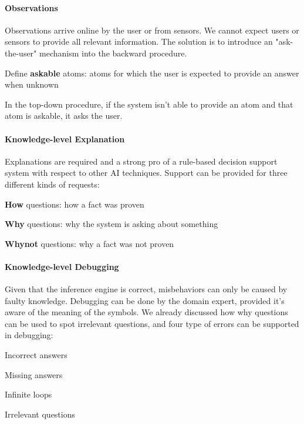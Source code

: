 \documentclass[10pt]{report}
\begin{document}
\paragraph{Observations} Observations arrive online by the user or from sensors. We cannot expect users or sensors to provide all relevant information. The solution is to introduce an "ask-the-user" mechanism into the backward procedure.
\begin{list}{}{}
	\item Define \textbf{askable} atoms: atoms for which the user is expected to provide an answer when unknown
	\item In the top-down procedure, if the system isn't able to provide an atom and that atom is askable, it asks the user.
\end{list}
\paragraph{Knowledge-level Explanation} Explanations are required and a strong pro of a rule-based decision support system with respect to other AI techniques. Support can be provided for three different kinds of requests:
\begin{list}{}{}
	\item \textbf{How} questions: how a fact was proven
	\item \textbf{Why} questions: why the system is asking about something
	\item \textbf{Whynot} questions: why a fact was not proven
\end{list}
\paragraph{Knowledge-level Debugging} Given that the inference engine is correct, misbehaviors can only be caused by faulty knowledge. Debugging can be done by the domain expert, provided it's aware of the meaning of the symbols. We already discussed how why questions can be used to spot irrelevant questions, and four type of errors can be supported in debugging:
\begin{list}{}{}
	\item Incorrect answers
	\item Missing answers
	\item Infinite loops
	\item Irrelevant questions
\end{list}
\end{document}
